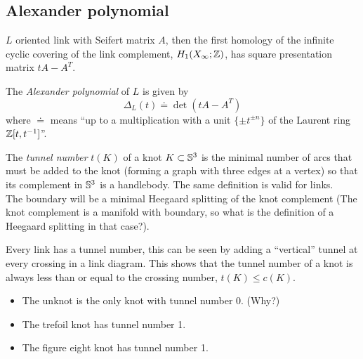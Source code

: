 \subsection{Alexander polynomial}

\begin{definition}
	$L$ oriented link with Seifert matrix $A$, then the first homology of
	the infinite cyclic covering of the link complement, $H_1(X_{\infty} ; \mathbb{Z})$,
	has square presentation matrix $t A - A^{T}$.
	
	The \textit{Alexander polynomial} of $L$ is given by
	\begin{equation*}
		\Delta_{L}(t) \doteq \det(t A - A^{T})
	\end{equation*}
	where $\doteq$ means ``up to a multiplication with a unit $\{ \pm t^{\pm n} \}$
	of the Laurent ring $\mathbb{Z}[t, t^{-1}]$''.
\end{definition}




\begin{definition}
	The \textit{tunnel number} $t(K)$ of a knot $K \subset \mathbb{S}^{3}$ is the minimal number of arcs
	that must be added to the knot (forming a graph with three edges at a vertex) so that
	its complement in $\mathbb{S}^{3}$ is a handlebody. The same definition is
	valid for links. \\
	The boundary will be a minimal Heegaard splitting of the knot complement
	(The knot complement is a manifold with boundary, so what is the definition
	of a Heegaard splitting in that case?).
\end{definition}

\begin{remark}
	Every link has a tunnel number, this can be seen by adding a ``vertical''
	tunnel at every crossing in a link diagram.
	This shows that the tunnel number of a knot is always less than or equal
	to the crossing number, $t(K) \le c(K)$.
\end{remark}

\begin{example}
	\begin{itemize}
		\item The unknot is the only knot with tunnel number 0. (Why?)
		\item The trefoil knot has tunnel number 1.
		\item The figure eight knot has tunnel number 1.
	\end{itemize}
\end{example}




